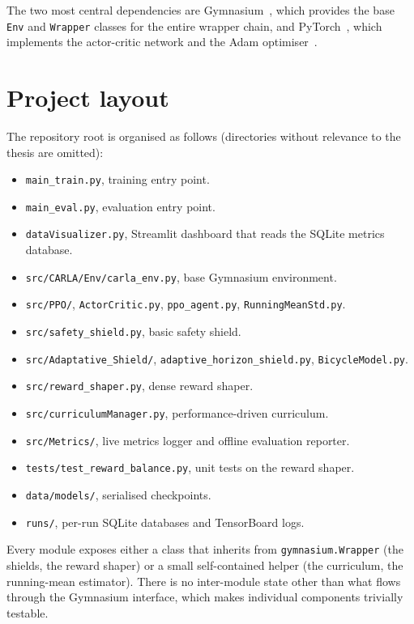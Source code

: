 The two most central dependencies are Gymnasium~\cite{towers2024gymnasium}, which provides the
base \texttt{Env} and \texttt{Wrapper} classes for the entire wrapper chain, and
PyTorch~\cite{paszke2019pytorch}, which implements the actor-critic network and the Adam
optimiser~\cite{kingma2014adam}.

\section{Project layout}\label{sec:impl-layout}

The repository root is organised as follows (directories without relevance to the thesis are
omitted):

\begin{itemize}
  \item \texttt{main\_train.py}, training entry point.
  \item \texttt{main\_eval.py}, evaluation entry point.
  \item \texttt{dataVisualizer.py}, Streamlit dashboard that reads the SQLite
        metrics database.
  \item \texttt{src/CARLA/Env/carla\_env.py}, base Gymnasium environment.
  \item \texttt{src/PPO/}, \texttt{ActorCritic.py}, \texttt{ppo\_agent.py},
        \texttt{RunningMeanStd.py}.
  \item \texttt{src/safety\_shield.py}, basic safety shield.
  \item \texttt{src/Adaptative\_Shield/}, \texttt{adaptive\_horizon\_shield.py},
        \texttt{BicycleModel.py}.
  \item \texttt{src/reward\_shaper.py}, dense reward shaper.
  \item \texttt{src/curriculumManager.py}, performance-driven curriculum.
  \item \texttt{src/Metrics/}, live metrics logger and offline evaluation reporter.
  \item \texttt{tests/test\_reward\_balance.py}, unit tests on the reward shaper.
  \item \texttt{data/models/}, serialised checkpoints.
  \item \texttt{runs/}, per-run SQLite databases and TensorBoard logs.
\end{itemize}

Every module exposes either a class that inherits from \texttt{gymnasium.Wrapper} (the shields,
the reward shaper) or a small self-contained helper (the curriculum, the running-mean estimator).
There is no inter-module state other than what flows through the Gymnasium interface, which makes
individual components trivially testable.

